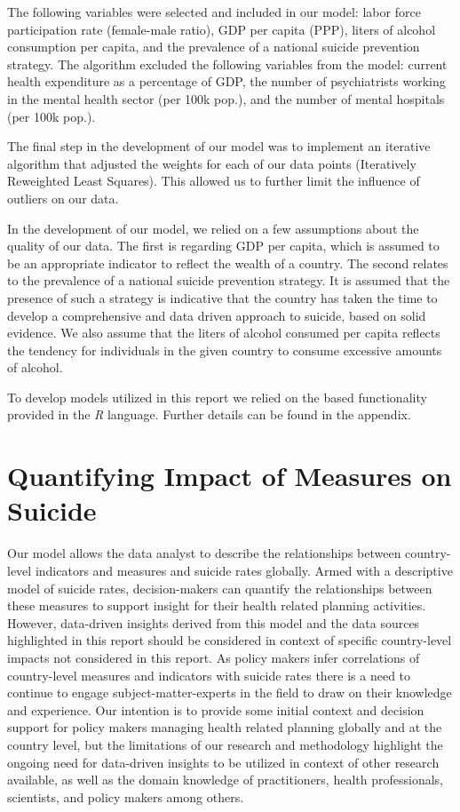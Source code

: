 \documentclass[]{article}
\begin{document}
The following variables were selected and included in our model: labor
force participation rate (female-male ratio), GDP per capita (PPP),
liters of alcohol consumption per capita, and the prevalence of a
national suicide prevention strategy. The algorithm excluded the
following variables from the model: current health expenditure as a
percentage of GDP, the number of psychiatrists working in the mental
health sector (per 100k pop.), and the number of mental hospitals (per
100k pop.).

The final step in the development of our model was to implement an
iterative algorithm that adjusted the weights for each of our data
points (Iteratively Reweighted Least Squares). This allowed us to
further limit the influence of outliers on our data.

In the development of our model, we relied on a few assumptions about
the quality of our data. The first is regarding GDP per capita, which is
assumed to be an appropriate indicator to reflect the wealth of a
country. The second relates to the prevalence of a national suicide
prevention strategy. It is assumed that the presence of such a strategy
is indicative that the country has taken the time to develop a
comprehensive and data driven approach to suicide, based on solid
evidence. We also assume that the liters of alcohol consumed per capita
reflects the tendency for individuals in the given country to consume
excessive amounts of alcohol.

To develop models utilized in this report we relied on the based
functionality provided in the \emph{R} language. Further details can be
found in the appendix.

\section{Quantifying Impact of Measures on
Suicide}\label{quantifying-impact-of-measures-on-suicide}

Our model allows the data analyst to describe the relationships between
country-level indicators and measures and suicide rates globally. Armed
with a descriptive model of suicide rates, decision-makers can quantify
the relationships between these measures to support insight for their
health related planning activities. However, data-driven insights
derived from this model and the data sources highlighted in this report
should be considered in context of specific country-level impacts not
considered in this report. As policy makers infer correlations of
country-level measures and indicators with suicide rates there is a need
to continue to engage subject-matter-experts in the field to draw on
their knowledge and experience. Our intention is to provide some initial
context and decision support for policy makers managing health related
planning globally and at the country level, but the limitations of our
research and methodology highlight the ongoing need for data-driven
insights to be utilized in context of other research available, as well
as the domain knowledge of practitioners, health professionals,
scientists, and policy makers among others.
\end{document}
